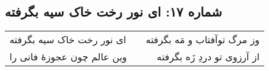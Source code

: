 \begin{center}
\section*{شماره ۱۷: ای نور رخت خاک سیه بگرفته}
\label{sec:017}
\begin{longtable}{l p{0.5cm} r}
ای نور رخت خاک سیه بگرفته
&&
وز مرگ توآفتاب و مَه بگرفته
\\
وین عالم چون عجوزهٔ فانی را
&&
از آرزوی تو دردِ زَه بگرفته
\\
\end{longtable}
\end{center}
